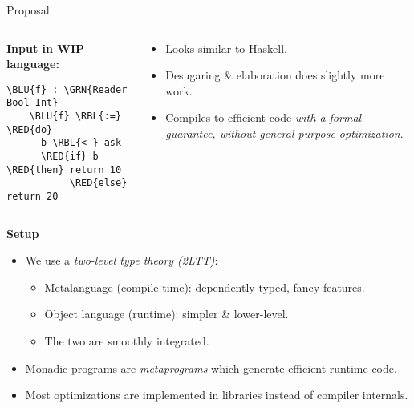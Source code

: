 \documentclass[dvipsnames,aspectratio=169]{beamer}
\theoremstyle{remark}
\newcommand{\RED}[1]{{\color{BrickRed} #1}}
\newcommand{\GRN}[1]{{\color{OliveGreen} #1}}
\newcommand{\RBL}[1]{{\color{RoyalBlue} #1}}
\newcommand{\BLU}[1]{{\color{Blue} #1}}
\begin{document}
\begin{frame}[fragile]{Proposal}

\begin{columns}
\begin{column}{0.3\textwidth}
\textbf{Input in WIP language:}
\begin{Verbatim}[commandchars=\\\{\}]
    \BLU{f} : \GRN{Reader Bool Int}
    \BLU{f} \RBL{:=} \RED{do}
      b \RBL{<-} ask
      \RED{if} b \RED{then} return 10
           \RED{else} return 20
\end{Verbatim}

\end{column}
\begin{column}{0.6\textwidth}
\begin{itemize}
\item Looks similar to Haskell.
\item Desugaring \& elaboration does slightly more work.
\item Compiles to efficient code \emph{with a formal guarantee, without
      general-purpose optimization}.
\end{itemize}
\end{column}
\end{columns}
\vspace{1em}
\pause

\begin{block}{}
\textbf{Setup}
\begin{itemize}
\item We use a \emph{two-level type theory (2LTT)}:
  \begin{itemize}
    \item Metalanguage (compile time): dependently typed, fancy features.
    \item Object language (runtime): simpler \& lower-level.
    \item The two are smoothly integrated.
  \end{itemize}
\item Monadic programs are \emph{metaprograms} which generate efficient
  runtime code.
\item Most optimizations are implemented in libraries instead of compiler internals.
\end{itemize}
\end{block}

\end{frame}
\end{document}

